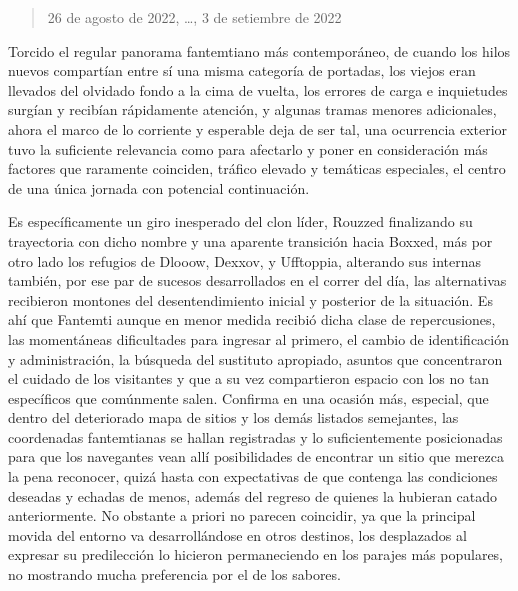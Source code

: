 \documentclass[
]{book}
\begin{document}
\begin{quote}
26 de agosto de 2022, \ldots, 3 de setiembre de 2022
\end{quote}

Torcido el regular panorama fantemtiano más contemporáneo, de cuando los hilos nuevos compartían entre sí una misma categoría de portadas, los viejos eran llevados del olvidado fondo a la cima de vuelta, los errores de carga e inquietudes surgían y recibían rápidamente atención, y algunas tramas menores adicionales, ahora el marco de lo corriente y esperable deja de ser tal, una ocurrencia exterior tuvo la suficiente relevancia como para afectarlo y poner en consideración más factores que raramente coinciden, tráfico elevado y temáticas especiales, el centro de una única jornada con potencial continuación.

Es específicamente un giro inesperado del clon líder, Rouzzed finalizando su trayectoria con dicho nombre y una aparente transición hacia Boxxed, más por otro lado los refugios de Dlooow, Dexxov, y Ufftoppia, alterando sus internas también, por ese par de sucesos desarrollados en el correr del día, las alternativas recibieron montones del desentendimiento inicial y posterior de la situación. Es ahí que Fantemti aunque en menor medida recibió dicha clase de repercusiones, las momentáneas dificultades para ingresar al primero, el cambio de identificación y administración, la búsqueda del sustituto apropiado, asuntos que concentraron el cuidado de los visitantes y que a su vez compartieron espacio con los no tan específicos que comúnmente salen. Confirma en una ocasión más, especial, que dentro del deteriorado mapa de sitios y los demás listados semejantes, las coordenadas fantemtianas se hallan registradas y lo suficientemente posicionadas para que los navegantes vean allí posibilidades de encontrar un sitio que merezca la pena reconocer, quizá hasta con expectativas de que contenga las condiciones deseadas y echadas de menos, además del regreso de quienes la hubieran catado anteriormente. No obstante a priori no parecen coincidir, ya que la principal movida del entorno va desarrollándose en otros destinos, los desplazados al expresar su predilección lo hicieron permaneciendo en los parajes más populares, no mostrando mucha preferencia por el de los sabores.
\end{document}
